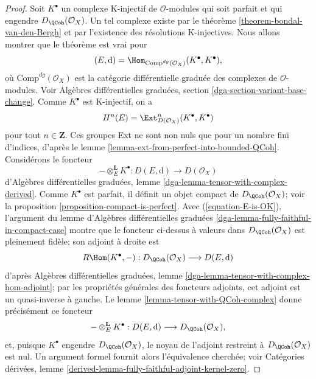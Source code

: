 \begin{proof}
Soit $K^\bullet$ un complexe K-injectif de $\mathcal{O}$-modules qui soit
parfait et qui engendre $D_\QCoh(\mathcal{O}_X)$. Un tel complexe existe par le
th\'eor\`eme \ref{theorem-bondal-van-den-Bergh} et par l'existence des
r\'esolutions K-injectives. Nous allons montrer que le th\'eor\`eme est vrai pour
$$
(E, \text{d}) = \Hom_{\text{Comp}^{dg}(\mathcal{O}_X)}(K^\bullet, K^\bullet),
$$
o\`u $\text{Comp}^{dg}(\mathcal{O}_X)$ est la cat\'egorie diff\'erentielle
gradu\'ee des complexes de $\mathcal{O}$-modules. Voir Alg\`ebres
diff\'erentielles gradu\'ees, section
\ref{dga-section-variant-base-change}. Comme $K^\bullet$ est K-injectif, on a
\begin{equation}
\label{equation-E-is-OK}
H^n(E) = \Ext^n_{D(\mathcal{O}_X)}(K^\bullet, K^\bullet)
\end{equation}
pour tout $n\in\mathbf{Z}$. Ces groupes Ext ne sont non nuls
que pour un nombre fini d'indices, d'apr\`es le lemme \ref{lemma-ext-from-perfect-into-bounded-QCoh}.
Consid\'erons le foncteur
$$
- \otimes_E^\mathbf{L} K^\bullet :
D(E, \text{d}) \longrightarrow D(\mathcal{O}_X)
$$
d'Alg\`ebres diff\'erentielles gradu\'ees, lemme
\ref{dga-lemma-tensor-with-complex-derived}. Comme
$K^\bullet$ est parfait, il d\'efinit un objet compact de
$D_\QCoh(\mathcal{O}_X)$; voir la proposition \ref{proposition-compact-is-perfect}.
Avec (\ref{equation-E-is-OK}), l'argument du lemme d'Alg\`ebres diff\'erentielles
gradu\'ees \ref{dga-lemma-fully-faithful-in-compact-case} montre que le foncteur
ci-dessus \`a valeurs dans $D_\QCoh(\mathcal{O}_X)$ est pleinement fid\`ele; son adjoint \`a droite est
$$
R\Hom(K^\bullet, - ) : D_\QCoh(\mathcal{O}_X) \longrightarrow D(E, \text{d})
$$
d'apr\`es Alg\`ebres diff\'erentielles gradu\'ees, lemme
\ref{dga-lemma-tensor-with-complex-hom-adjoint}; par les propri\'et\'es g\'en\'erales
des foncteurs adjoints, cet adjoint est un quasi-inverse \`a gauche. Le lemme
\ref{lemma-tensor-with-QCoh-complex} donne pr\'ecis\'ement ce foncteur
$$
- \otimes_E^\mathbf{L} K^\bullet :
D(E, \text{d}) \longrightarrow D_\QCoh(\mathcal{O}_X),
$$
et, puisque $K^\bullet$ engendre $D_\QCoh(\mathcal{O}_X)$, le noyau de
l'adjoint restreint \`a $D_\QCoh(\mathcal{O}_X)$ est nul. Un argument formel
fournit alors l'\'equivalence cherch\'ee; voir Cat\'egories d\'eriv\'ees, lemme
\ref{derived-lemma-fully-faithful-adjoint-kernel-zero}.
\end{proof}

